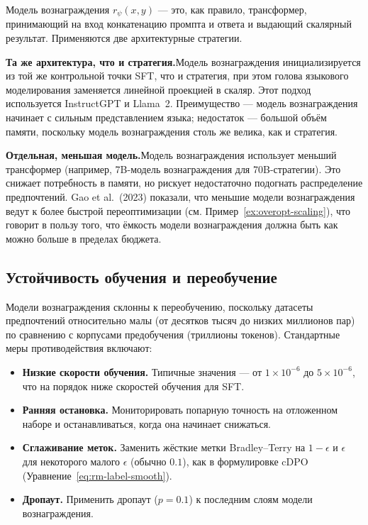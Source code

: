 Модель вознаграждения $r_\psi(x, y)$ --- это, как правило, трансформер, принимающий на вход конкатенацию промпта и ответа и выдающий скалярный результат. Применяются две архитектурные стратегии.

\textbf{Та же архитектура, что и стратегия.}\quad Модель вознаграждения инициализируется из той же контрольной точки SFT, что и стратегия, при этом голова языкового моделирования заменяется линейной проекцией в скаляр. Этот подход используется InstructGPT и Llama~2. Преимущество --- модель вознаграждения начинает с сильным представлением языка; недостаток --- большой объём памяти, поскольку модель вознаграждения столь же велика, как и стратегия.

\textbf{Отдельная, меньшая модель.}\quad Модель вознаграждения использует меньший трансформер (например, 7B-модель вознаграждения для 70B-стратегии). Это снижает потребность в памяти, но рискует недостаточно подогнать распределение предпочтений. Gao et al.\ (2023) показали, что меньшие модели вознаграждения ведут к более быстрой переоптимизации (см. Пример~\ref{ex:overopt-scaling}), что говорит в пользу того, что ёмкость модели вознаграждения должна быть как можно больше в пределах бюджета.

\subsection{Устойчивость обучения и переобучение}
\label{sec:rm-overfitting}

Модели вознаграждения склонны к переобучению, поскольку датасеты предпочтений относительно малы (от десятков тысяч до низких миллионов пар) по сравнению с корпусами предобучения (триллионы токенов). Стандартные меры противодействия включают:
\begin{itemize}[leftmargin=*]
  \item \textbf{Низкие скорости обучения.} Типичные значения --- от $1 \times 10^{-6}$ до $5 \times 10^{-6}$, что на порядок ниже скоростей обучения для SFT.
  \item \textbf{Ранняя остановка.} Мониторировать попарную точность на отложенном наборе и останавливаться, когда она начинает снижаться.
  \item \textbf{Сглаживание меток.} Заменить жёсткие метки Bradley--Terry на $1 - \epsilon$ и $\epsilon$ для некоторого малого $\epsilon$ (обычно $0.1$), как в формулировке cDPO (Уравнение~\eqref{eq:rm-label-smooth}).
  \item \textbf{Дропаут.} Применить дропаут ($p = 0.1$) к последним слоям модели вознаграждения.
\end{itemize}

